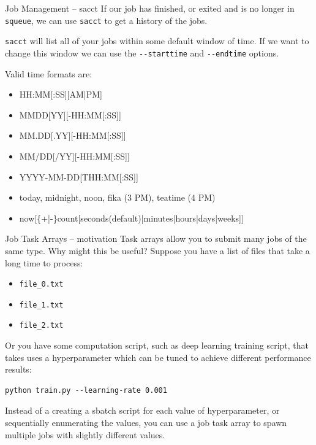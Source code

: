 \documentclass[10pt]{beamer}
\begin{document}
\begin{frame}[label={sec:org81fd60d},fragile]{Job Management -- sacct}
 If our job has finished, or exited and is no longer in \texttt{squeue}, we can use \texttt{sacct}
to get a history of the jobs.

\texttt{sacct} will list all of your jobs within some default window of time. If we want
to change this window we can use the \texttt{-{}-starttime} and \texttt{-{}-endtime} options.

Valid time formats are:
\begin{itemize}
\item HH:MM[:SS][AM|PM]
\item MMDD[YY][-HH:MM[:SS]]
\item MM.DD[.YY][-HH:MM[:SS]]
\item MM/DD[/YY][-HH:MM[:SS]]
\item YYYY-MM-DD[THH:MM[:SS]]
\item today, midnight, noon, fika (3 PM), teatime (4 PM)
\item now[\{+|-\}count[seconds(default)|minutes|hours|days|weeks]]
\end{itemize}
\end{frame}

\begin{frame}[label={sec:orgbdf96cb},fragile]{Job Task Arrays -- motivation}
 Task arrays allow you to submit many jobs of the same type. Why might this be
useful? Suppose you have a list of files that take a long time to process:

\begin{itemize}
\item \texttt{file\_0.txt}
\item \texttt{file\_1.txt}
\item \texttt{file\_2.txt}
\end{itemize}

Or you have some computation script, such as deep learning training script, that
takes uses a hyperparameter which can be tuned to achieve different performance
results:

\begin{verbatim}
python train.py --learning-rate 0.001
\end{verbatim}

Instead of a creating a sbatch script for each value of hyperparameter, or
sequentially enumerating the values, you can use a job task array to spawn
multiple jobs with slightly different values.
\end{frame}
\end{document}
